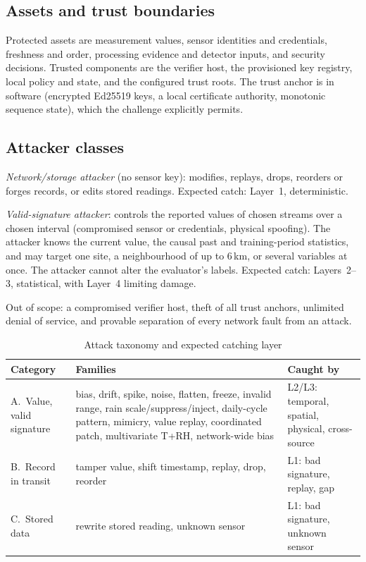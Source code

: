 \documentclass[conference]{IEEEtran}
\begin{document}
\subsection{Assets and trust boundaries}
Protected assets are measurement values, sensor identities and credentials, freshness and order, processing
evidence and detector inputs, and security decisions. Trusted components are the verifier host, the
provisioned key registry, local policy and state, and the configured trust roots. The trust anchor is in
software (encrypted Ed25519 keys, a local certificate authority, monotonic sequence state), which the
challenge explicitly permits.

\subsection{Attacker classes}
\emph{Network/storage attacker} (no sensor key): modifies, replays, drops, reorders or forges records, or
edits stored readings. Expected catch: Layer~1, deterministic.

\emph{Valid-signature attacker}: controls the reported values of chosen streams over a chosen interval
(compromised sensor or credentials, physical spoofing). The attacker knows the current value, the causal past
and training-period statistics, and may target one site, a neighbourhood of up to 6\,km, or several variables
at once. The attacker cannot alter the evaluator's labels. Expected catch: Layers~2--3, statistical, with
Layer~4 limiting damage.

Out of scope: a compromised verifier host, theft of all trust anchors, unlimited denial of service, and
provable separation of every network fault from an attack.

\begin{table}[t]
\caption{Attack taxonomy and expected catching layer}
\label{tab:taxonomy}
\centering
\small
\begin{tabular}{@{}>{\raggedright}p{}>{\raggedright}p{}>{\raggedright\arraybackslash}p{}@{}}
\toprule
Category & Families & Caught by \\
\midrule
A.~Value, valid signature & bias, drift, spike, noise, flatten, freeze, invalid range, rain scale/suppress/inject,
daily-cycle pattern, mimicry, value replay, coordinated patch, multivariate T+RH, network-wide bias &
L2/L3: temporal, spatial, physical, cross-source \\
B.~Record in transit & tamper value, shift timestamp, replay, drop, reorder & L1: bad signature, replay, gap \\
C.~Stored data & rewrite stored reading, unknown sensor & L1: bad signature, unknown sensor \\
\bottomrule
\end{tabular}
\end{table}
\end{document}
